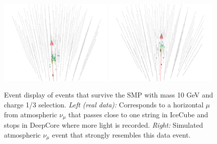 \begin{appendices}
\begin{figure}
\centering
\includegraphics[width=0.49\textwidth]{appendix/img/FINAL_data_m_10_ch1ovr3_1.png}
\includegraphics[width=0.49\textwidth]{appendix/img/FINAL_data_m_10_ch1ovr3_1_NUMUANALOGY.png}
\caption{Event display of events that survive the SMP with mass 10 GeV and charge 1/3 selection. \textit{Left (real data): }Corresponds to a horizontal $\mu$ from atmospheric $\nu_\mu$ that passes close to one string in IceCube and stops in DeepCore where more light is recorded. \textit{Right: }Simulated atmospheric $\nu_\mu$ event that strongly resembles this data event.}
\label{fig:final_3}
\end{figure}


\end{appendices}
